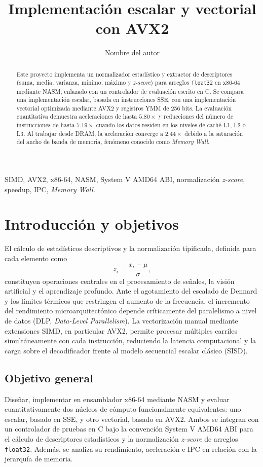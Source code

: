 \documentclass[journal]{IEEEtran}
\title{Implementación escalar y vectorial con AVX2}
\author{Nombre del autor}
\begin{document}
\maketitle

\begin{abstract}
Este proyecto implementa un normalizador estadístico y extractor de
descriptores (suma, media, varianza, mínimo, máximo y \textit{z-score}) para
arreglos \texttt{float32} en x86-64 mediante NASM, enlazado con un controlador
de evaluación escrito en C. Se compara una implementación escalar, basada en
instrucciones SSE, con una implementación vectorial optimizada mediante AVX2 y
registros YMM de 256 bits. La evaluación cuantitativa demuestra aceleraciones
de hasta $5.80\times$ y reducciones del número de instrucciones de hasta
$7.19\times$ cuando los datos residen en los niveles de caché L1, L2 o L3. Al
trabajar desde DRAM, la aceleración converge a $2.44\times$ debido a la
saturación del ancho de banda de memoria, fenómeno conocido como
\textit{Memory Wall}.
\end{abstract}

\begin{IEEEkeywords}
SIMD, AVX2, x86-64, NASM, System V AMD64 ABI, normalización \textit{z-score},
speedup, IPC, \textit{Memory Wall}.
\end{IEEEkeywords}

\section{Introducción y objetivos}
El cálculo de estadísticos descriptivos y la normalización tipificada,
definida para cada elemento como
\begin{equation}
  z_i = \frac{x_i-\mu}{\sigma},
  \label{eq:zscore}
\end{equation}
constituyen operaciones centrales en el procesamiento de señales, la visión
artificial y el aprendizaje profundo. Ante el agotamiento del escalado de
Dennard y los límites térmicos que restringen el aumento de la frecuencia, el
incremento del rendimiento microarquitectónico depende críticamente del
paralelismo a nivel de datos (DLP, \textit{Data-Level Parallelism}). La
vectorización manual mediante extensiones SIMD, en particular AVX2, permite
procesar múltiples carriles simultáneamente con cada instrucción, reduciendo la
latencia computacional y la carga sobre el decodificador frente al modelo
secuencial escalar clásico (SISD).

\subsection{Objetivo general}
Diseñar, implementar en ensamblador x86-64 mediante NASM y evaluar
cuantitativamente dos núcleos de cómputo funcionalmente equivalentes: uno
escalar, basado en SSE, y otro vectorial, basado en AVX2. Ambos se integran con
un controlador de pruebas en C bajo la convención System V AMD64 ABI para el
cálculo de descriptores estadísticos y la normalización \textit{z-score} de
arreglos \texttt{float32}. Además, se analiza su rendimiento, aceleración e IPC
en relación con la jerarquía de memoria.
\end{document}
